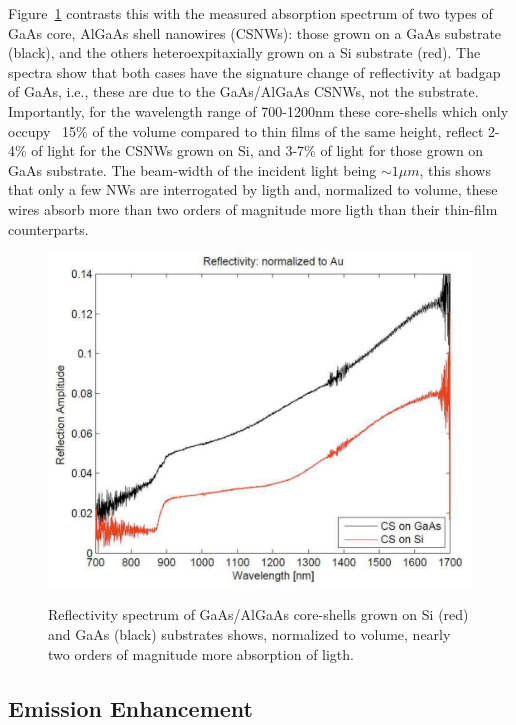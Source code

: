 Figure~\ref{reflectCSNW} contrasts this with the measured absorption spectrum
of two types of GaAs core, AlGaAs shell nanowires (CSNWs): those grown on a
GaAs substrate (black), and the others heteroexpitaxially grown on a Si
substrate (red). The spectra show that both cases have the signature change of
reflectivity at badgap of GaAs, i.e., these are due to the GaAs/AlGaAs CSNWs,
not the substrate. Importantly, for the wavelength range of 700-1200nm these
core-shells which only occupy ~15\% of the volume compared to thin films of the
same height, reflect 2-4\% of light for the CSNWs grown on Si, and 3-7\% of
light for those grown on GaAs substrate. The beam-width of the incident light
being $\sim1{\mu}m$, this shows that only a few NWs are interrogated by ligth
and, normalized to volume, these wires absorb more than two orders of magnitude
more ligth than their thin-film counterparts.

\begin{figure}
  \caption{Reflectivity spectrum of GaAs/AlGaAs core-shells grown on Si (red) and GaAs (black) substrates shows, normalized to volume, nearly two orders of magnitude more absorption of ligth.}
  \centering
  \includegraphics[width=\textwidth]{pictures/Data/reflectCSNW}
  \label{reflectCSNW}
\end{figure}

\subsection{Emission Enhancement} \label{Dust_data}

